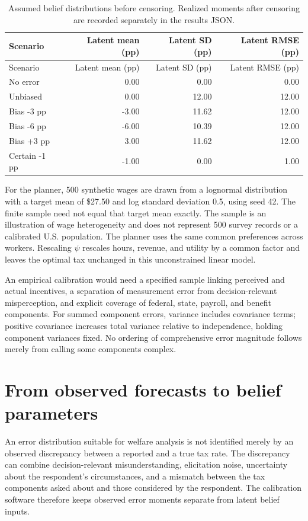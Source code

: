 \documentclass[
  11pt,
  letterpaper,
  DIV=11,
  numbers=noendperiod]{scrartcl}
\begin{document}
\begin{longtable}[]{@{}lrrr@{}}
\caption{Assumed belief distributions before censoring. Realized moments
after censoring are recorded separately in the results
JSON.}\label{tbl-beliefs}\tabularnewline
\toprule\noalign{}
Scenario & Latent mean (pp) & Latent SD (pp) & Latent RMSE (pp) \\
\midrule\noalign{}
\endfirsthead
\toprule\noalign{}
Scenario & Latent mean (pp) & Latent SD (pp) & Latent RMSE (pp) \\
\midrule\noalign{}
\endhead
\bottomrule\noalign{}
\endlastfoot
No error & 0.00 & 0.00 & 0.00 \\
Unbiased & 0.00 & 12.00 & 12.00 \\
Bias -3 pp & -3.00 & 11.62 & 12.00 \\
Bias -6 pp & -6.00 & 10.39 & 12.00 \\
Bias +3 pp & 3.00 & 11.62 & 12.00 \\
Certain -1 pp & -1.00 & 0.00 & 1.00 \\
\end{longtable}

For the planner, 500 synthetic wages are drawn from a lognormal
distribution with a target mean of \$27.50 and log standard deviation
0.5, using seed 42. The finite sample need not equal that target mean
exactly. The sample is an illustration of wage heterogeneity and does
not represent 500 survey records or a calibrated U.S. population. The
planner uses the same common preferences across workers. Rescaling
\(\psi\) rescales hours, revenue, and utility by a common factor and
leaves the optimal tax unchanged in this unconstrained linear model.

An empirical calibration would need a specified sample linking perceived
and actual incentives, a separation of measurement error from
decision-relevant misperception, and explicit coverage of federal,
state, payroll, and benefit components. For summed component errors,
variance includes covariance terms; positive covariance increases total
variance relative to independence, holding component variances fixed. No
ordering of comprehensive error magnitude follows merely from calling
some components complex.

\section{From observed forecasts to belief
parameters}\label{from-observed-forecasts-to-belief-parameters}

An error distribution suitable for welfare analysis is not identified
merely by an observed discrepancy between a reported and a true tax
rate. The discrepancy can combine decision-relevant misunderstanding,
elicitation noise, uncertainty about the respondent's circumstances, and
a mismatch between the tax components asked about and those considered
by the respondent. The calibration software therefore keeps observed
error moments separate from latent belief inputs.
\end{document}

